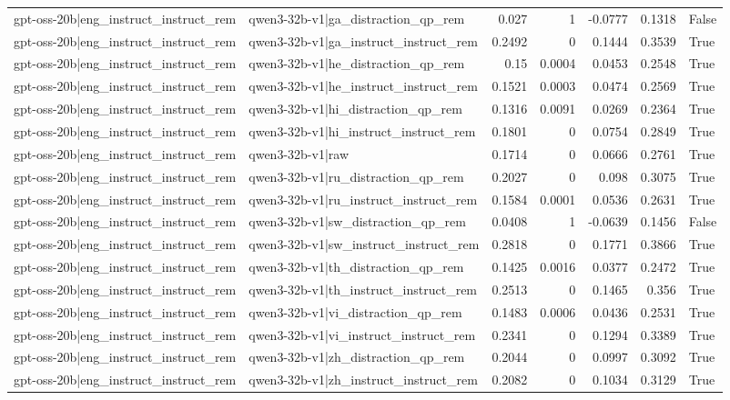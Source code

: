 \begin{table}
\begin{tabular}{l l r r r r l}
gpt-oss-20b|eng_instruct_instruct_rem & qwen3-32b-v1|ga_distraction_qp_rem & 0.027 & 1 & -0.0777 & 0.1318 & False \\
gpt-oss-20b|eng_instruct_instruct_rem & qwen3-32b-v1|ga_instruct_instruct_rem & 0.2492 & 0 & 0.1444 & 0.3539 & True \\
gpt-oss-20b|eng_instruct_instruct_rem & qwen3-32b-v1|he_distraction_qp_rem & 0.15 & 0.0004 & 0.0453 & 0.2548 & True \\
gpt-oss-20b|eng_instruct_instruct_rem & qwen3-32b-v1|he_instruct_instruct_rem & 0.1521 & 0.0003 & 0.0474 & 0.2569 & True \\
gpt-oss-20b|eng_instruct_instruct_rem & qwen3-32b-v1|hi_distraction_qp_rem & 0.1316 & 0.0091 & 0.0269 & 0.2364 & True \\
gpt-oss-20b|eng_instruct_instruct_rem & qwen3-32b-v1|hi_instruct_instruct_rem & 0.1801 & 0 & 0.0754 & 0.2849 & True \\
gpt-oss-20b|eng_instruct_instruct_rem & qwen3-32b-v1|raw & 0.1714 & 0 & 0.0666 & 0.2761 & True \\
gpt-oss-20b|eng_instruct_instruct_rem & qwen3-32b-v1|ru_distraction_qp_rem & 0.2027 & 0 & 0.098 & 0.3075 & True \\
gpt-oss-20b|eng_instruct_instruct_rem & qwen3-32b-v1|ru_instruct_instruct_rem & 0.1584 & 0.0001 & 0.0536 & 0.2631 & True \\
gpt-oss-20b|eng_instruct_instruct_rem & qwen3-32b-v1|sw_distraction_qp_rem & 0.0408 & 1 & -0.0639 & 0.1456 & False \\
gpt-oss-20b|eng_instruct_instruct_rem & qwen3-32b-v1|sw_instruct_instruct_rem & 0.2818 & 0 & 0.1771 & 0.3866 & True \\
gpt-oss-20b|eng_instruct_instruct_rem & qwen3-32b-v1|th_distraction_qp_rem & 0.1425 & 0.0016 & 0.0377 & 0.2472 & True \\
gpt-oss-20b|eng_instruct_instruct_rem & qwen3-32b-v1|th_instruct_instruct_rem & 0.2513 & 0 & 0.1465 & 0.356 & True \\
gpt-oss-20b|eng_instruct_instruct_rem & qwen3-32b-v1|vi_distraction_qp_rem & 0.1483 & 0.0006 & 0.0436 & 0.2531 & True \\
gpt-oss-20b|eng_instruct_instruct_rem & qwen3-32b-v1|vi_instruct_instruct_rem & 0.2341 & 0 & 0.1294 & 0.3389 & True \\
gpt-oss-20b|eng_instruct_instruct_rem & qwen3-32b-v1|zh_distraction_qp_rem & 0.2044 & 0 & 0.0997 & 0.3092 & True \\
gpt-oss-20b|eng_instruct_instruct_rem & qwen3-32b-v1|zh_instruct_instruct_rem & 0.2082 & 0 & 0.1034 & 0.3129 & True \\

\end{tabular}
\end{table}
